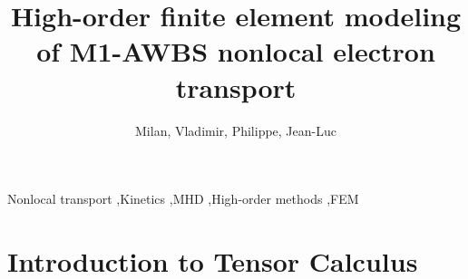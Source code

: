 \documentclass[review]{elsarticle}
\begin{document}
\begin{frontmatter}

\title{High-order finite element modeling of M1-AWBS nonlocal electron transport}

\author[celiaaddress]{Milan, Vladimir, Philippe, Jean-Luc}
\address[celiaaddress]{Universit\'{e} de Bordeaux - CNRS - CEA, CELIA, UMR 5107, F-33405 Talence, France}


\begin{abstract}

\end{abstract}

\begin{keyword}
Nonlocal transport \sep Kinetics \sep MHD \sep High-order methods \sep FEM
\end{keyword}

\end{frontmatter}

\linenumbers


\newpage

\section{Introduction to Tensor Calculus}
\end{document}
